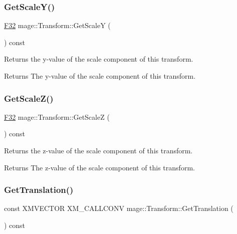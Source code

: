 \subsubsection{\texorpdfstring{Get\+Scale\+Y()}{GetScaleY()}}
{\footnotesize\ttfamily \mbox{\hyperlink{namespacemage_aa97e833b45f06d60a0a9c4fc22ae02c0}{F32}} mage\+::\+Transform\+::\+Get\+ScaleY (\begin{DoxyParamCaption}{ }\end{DoxyParamCaption}) const\hspace{0.3cm}{\ttfamily [noexcept]}}

Returns the y-\/value of the scale component of this transform.

\begin{DoxyReturn}{Returns}
The y-\/value of the scale component of this transform. 
\end{DoxyReturn}
\mbox{\label{classmage_1_1_transform_aa7ba1aa16161ec656b2828c2433f6dbd}} 
\subsubsection{\texorpdfstring{Get\+Scale\+Z()}{GetScaleZ()}}
{\footnotesize\ttfamily \mbox{\hyperlink{namespacemage_aa97e833b45f06d60a0a9c4fc22ae02c0}{F32}} mage\+::\+Transform\+::\+Get\+ScaleZ (\begin{DoxyParamCaption}{ }\end{DoxyParamCaption}) const\hspace{0.3cm}{\ttfamily [noexcept]}}

Returns the z-\/value of the scale component of this transform.

\begin{DoxyReturn}{Returns}
The z-\/value of the scale component of this transform. 
\end{DoxyReturn}
\mbox{\label{classmage_1_1_transform_a9248e3decb8b202cded00722f17cf642}} 
\subsubsection{\texorpdfstring{Get\+Translation()}{GetTranslation()}}
{\footnotesize\ttfamily const X\+M\+V\+E\+C\+T\+OR X\+M\+\_\+\+C\+A\+L\+L\+C\+O\+NV mage\+::\+Transform\+::\+Get\+Translation (\begin{DoxyParamCaption}{ }\end{DoxyParamCaption}) const\hspace{0.3cm}{\ttfamily [noexcept]}}

